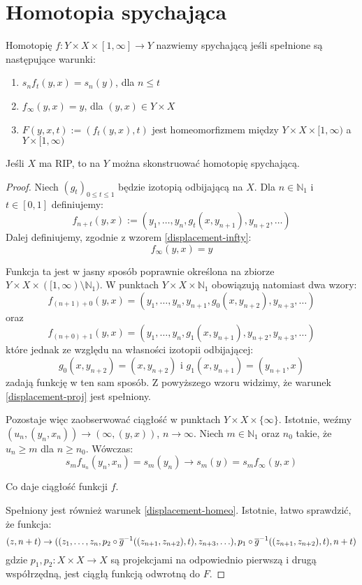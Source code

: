 \section{Homotopia spychająca}
\begin{df}
  Homotopię $f: Y \times X \times [1,\infty] \rightarrow Y$ nazwiemy spychającą jeśli spełnione są następujące warunki:
  \begin{enumerate}
    \item \label{displacement-proj} $s_n f_t(y,x) = s_n(y)$, dla $n \leq t$
    \item \label{displacement-infty} $f_\infty(y,x) = y$, dla $(y,x) \in Y \times X$
    \item \label{displacement-homeo} $F(y,x,t) := (f_t(y,x), t)$ jest homeomorfizmem między $Y \times X \times [1,\infty)$ a $Y \times [1,\infty)$
  \end{enumerate}
\end{df}


\begin{thm}
  Jeśli $X$ ma RIP, to na $Y$ można skonstruować homotopię spychającą.
  \begin{proof}
    Niech $(g_t)_{0 \leq t \leq 1}$ będzie izotopią odbijającą na $X$. Dla $n \in \mathbb{N}_1$ i $t \in [0,1]$ definiujemy:
    $$f_{n+t}(y,x) := (y_1, \ldots, y_n, g_t(x, y_{n+1}), y_{n+2}, \ldots)$$
    Dalej definiujemy, zgodnie z wzorem \ref{displacement-infty}:
    $$f_\infty(y,x) = y$$
    
    Funkcja ta jest w jasny sposób poprawnie określona na zbiorze $Y \times X \times ([1, \infty) \setminus \mathbb{N}_1)$. W punktach $Y \times X \times \mathbb{N}_1$ obowiązują natomiast dwa wzory:
    $$f_{(n+1) + 0}(y,x) = (y_1, \ldots, y_n, y_{n+1}, g_0(x, y_{n+2}), y_{n+3}, \ldots)$$
    oraz
    $$f_{(n+0) + 1}(y,x) = (y_1, \ldots, y_n, g_1(x, y_{n+1}), y_{n+2}, y_{n+3}, \ldots)$$
    które jednak ze względu na własności izotopii odbijającej:
    $$g_0(x, y_{n+2}) = (x, y_{n+2}) \mbox{ i } g_1(x, y_{n+1}) = (y_{n+1}, x)$$
    zadają funkcję w ten sam sposób. Z powyższego wzoru widzimy, że warunek \ref{displacement-proj} jest spełniony.
    
    Pozostaje więc zaobserwować ciągłość w punktach $Y \times X \times \{\infty\}$. Istotnie, weźmy $(u_n, (y_n, x_n)) \rightarrow (\infty, (y,x))$, $n \rightarrow \infty$. Niech $m \in \mathbb{N}_1$ oraz $n_0$ takie, że $u_n \geq m$ dla $n \geq n_0$. Wówczas:
    $$s_m f_{u_n}(y_n, x_n) = s_m(y_n) \rightarrow s_m(y) = s_m f_\infty (y,x)$$
    
    Co daje ciągłość funkcji $f$.
    
    Spełniony jest również warunek \ref{displacement-homeo}. Istotnie, łatwo sprawdzić, że funkcja:
    $$(z, n+t) \rightarrow ((z_1, \ldots, z_n, p_2 \circ \overline{g}^{-1} ((z_{n+1}, z_{n+2}), t), z_{n+3}, \ldots), p_1 \circ \overline{g}^{-1}((z_{n+1}, z_{n+2}), t), n+t)$$
    gdzie $p_1, p_2:  X \times X \rightarrow X$ są projekcjami na odpowiednio pierwszą i drugą współrzędną, jest ciągłą funkcją odwrotną do $F$.
  \end{proof}
\end{thm}
